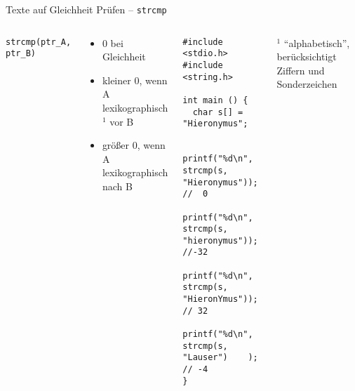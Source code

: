 \begin{frame}[fragile]{Texte auf Gleichheit Prüfen -- \texttt{strcmp}}
%
\begin{columns}[T]
\begin{codebox}[Syntax]
\footnotesize\texttt{strcmp(ptr\_A, ptr\_B)}
\end{codebox}
%
\begin{tcolorbox}[title=Rückgabewerte]
\begin{itemize}
\item 0 bei Gleichheit
\item kleiner 0, wenn A lexikographisch${}^{1}$ vor B
\item größer 0, wenn A lexikographisch nach B
\end{itemize}
\end{tcolorbox}
%
\begin{codebox}[Beispiel]
\begin{verbatim}
#include <stdio.h>
#include <string.h>

int main () {
  char s[] = "Hieronymus";
  
  printf("%d\n", strcmp(s, "Hieronymus")); //  0
  printf("%d\n", strcmp(s, "hieronymus")); //-32
  printf("%d\n", strcmp(s, "HieronYmus")); // 32
  printf("%d\n", strcmp(s, "Lauser")    ); // -4
}
\end{verbatim}
\end{codebox}
\scriptsize ${}^{1}$ \enquote{alphabetisch}, berücksichtigt Ziffern und Sonderzeichen
%
\end{columns}
%
\end{frame}


